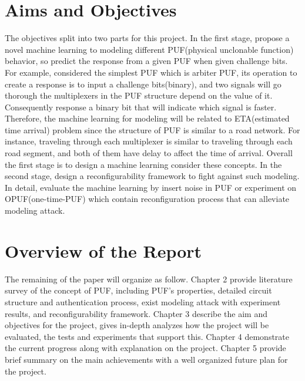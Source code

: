 \section{Aims and Objectives}
The objectives split into two parts for this project. In the first stage, propose a novel machine learning to modeling different PUF(physical unclonable function)
behavior, so predict the response from a given PUF when given challenge bits. For example, considered the simplest PUF which is arbiter PUF, its operation to create a response is to
input a challenge bits(binary), and two signals will go thorough the multiplexers in the PUF structure depend on the value of it. Consequently response a binary bit
that will indicate which signal is faster. Therefore, the machine learning for modeling will be related to ETA(estimated time arrival) problem since the structure of PUF is similar to a road network. 
For instance, traveling through each multiplexer is similar to traveling through each road segment, and both of them have delay to affect the time of arrival. Overall the first stage is to design a machine learning
consider these concepts. In the second stage, design a reconfigurability framework to fight against such modeling. In detail, evaluate the machine learning by insert noise in PUF or experiment on OPUF(one-time-PUF) which
contain reconfiguration process that can alleviate modeling attack.

\section{Overview of the Report}
The remaining of the paper will organize as follow. Chapter 2 provide literature survey of the concept of PUF, including PUF's properties, detailed circuit structure and authentication process, 
exist modeling attack with experiment results, and reconfigurability framework. Chapter 3 describe the aim and objectives for the project, gives in-depth analyzes how the project will be evaluated, 
the tests and experiments that support this. Chapter 4 demonstrate the current progress along with explanation on the project. Chapter 5 provide brief summary on the main achievements with a well 
organized future plan for the project.

